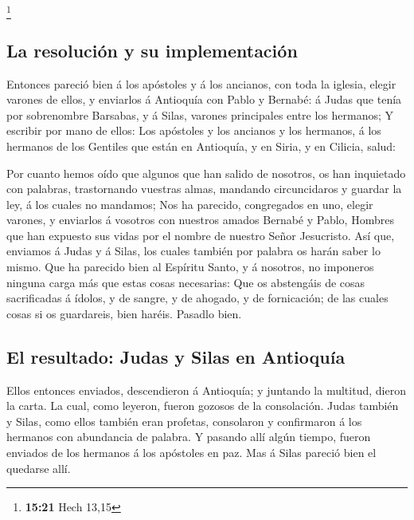 \footnote{\textbf{15:21} Hech 13,15}

\hypertarget{la-resoluciuxf3n-y-su-implementaciuxf3n}{%
\subsection{La resolución y su
implementación}\label{la-resoluciuxf3n-y-su-implementaciuxf3n}}

 Entonces pareció bien á los apóstoles y á los ancianos,
con toda la iglesia, elegir varones de ellos, y enviarlos á Antioquía
con Pablo y Bernabé: á Judas que tenía por sobrenombre Barsabas, y á
Silas, varones principales entre los hermanos;  Y escribir
por mano de ellos: Los apóstoles y los ancianos y los hermanos, á los
hermanos de los Gentiles que están en Antioquía, y en Siria, y en
Cilicia, salud:

 Por cuanto hemos oído que algunos que han salido de
nosotros, os han inquietado con palabras, trastornando vuestras almas,
mandando circuncidaros y guardar la ley, á los cuales no mandamos;
 Nos ha parecido, congregados en uno, elegir varones, y
enviarlos á vosotros con nuestros amados Bernabé y Pablo, 
Hombres que han expuesto sus vidas por el nombre de nuestro Señor
Jesucristo.  Así que, enviamos á Judas y á Silas, los
cuales también por palabra os harán saber lo mismo.  Que ha
parecido bien al Espíritu Santo, y á nosotros, no imponeros ninguna
carga más que estas cosas necesarias:  Que os abstengáis de
cosas sacrificadas á ídolos, y de sangre, y de ahogado, y de
fornicación; de las cuales cosas si os guardareis, bien haréis. Pasadlo
bien.

\hypertarget{el-resultado-judas-y-silas-en-antioquuxeda}{%
\subsection{El resultado: Judas y Silas en
Antioquía}\label{el-resultado-judas-y-silas-en-antioquuxeda}}

 Ellos entonces enviados, descendieron á Antioquía; y
juntando la multitud, dieron la carta.  La cual, como
leyeron, fueron gozosos de la consolación.  Judas también y
Silas, como ellos también eran profetas, consolaron y confirmaron á los
hermanos con abundancia de palabra.  Y pasando allí algún
tiempo, fueron enviados de los hermanos á los apóstoles en paz.
 Mas á Silas pareció bien el quedarse allí.

